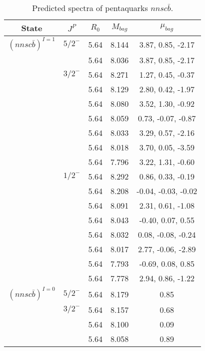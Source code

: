 \documentclass[prd,twocolumn,floatfix,nofootinbib]{revtex4}
\begin{document}
\renewcommand{\tabcolsep}{0.5cm}
\renewcommand{\arraystretch}{1.2}
\begin{table*}[!htbp]
    \caption{Predicted spectra of pentaquarks $nnsc\bar{b}$.}
    \begin{tabular}{ccccc}
        \hline\hline
        {\rm State} &$J^{P}$ &$R_{0}$ &$M_{bag}$ &$\mu_{bag}$ \\ \hline
        ${(nnsc\bar{b})}^{I=1}$
            &${5/2}^{-}$    &5.64  &8.144  &3.87, 0.85, -2.17\\
            &               &5.64   &8.036 &3.87, 0.85, -2.17  \\
            &${3/2}^{-}$    &5.64   &8.271 &1.27, 0.45, -0.37 \\
            &               &5.64   &8.129 &2.80, 0.42, -1.97  \\
            &               &5.64   &8.080 &3.52, 1.30, -0.92  \\
            &               &5.64   &8.059 &0.73, -0.07, -0.87  \\
            &               &5.64   &8.033 &3.29, 0.57, -2.16  \\
            &               &5.64   &8.018 &3.70, 0.05, -3.59  \\
            &               &5.64   &7.796 &3.22, 1.31, -0.60  \\
            &${1/2}^{-}$    &5.64   &8.292 &0.86, 0.33, -0.19  \\
            &               &5.64   &8.208 &-0.04, -0.03, -0.02  \\
            &               &5.64   &8.091 &2.31, 0.61, -1.08  \\
            &               &5.64   &8.043 &-0.40, 0.07, 0.55  \\
            &               &5.64   &8.032 &0.08, -0.08, -0.24  \\
            &               &5.64   &8.017 &2.77, -0.06, -2.89  \\
            &               &5.64   &7.793 &-0.69, 0.08, 0.85  \\
            &               &5.64   &7.778 &2.94, 0.86, -1.22  \\
        ${(nnsc\bar{b})}^{I=0}$
            &${5/2}^{-}$    &5.64   &8.179 &0.85 \\
            &${3/2}^{-}$    &5.64   &8.157 &0.68 \\
            &               &5.64   &8.100 &0.09  \\
            &               &5.64   &8.058 &0.89  \\

\end{tabular}
\end{table*}
\end{document}
